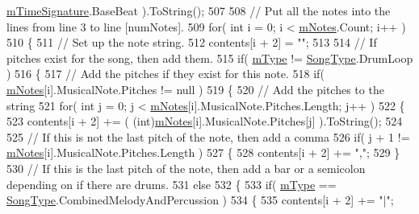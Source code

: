 \begin{DoxyCode}
      \hyperlink{group___song_priv_var_ga2b2dcc0e83e49f7303b6a1371877b25e}{mTimeSignature}.BaseBeat ).ToString();
507 
508         \textcolor{comment}{// Put all the notes into the lines from line 3 to line [numNotes].  }
509         \textcolor{keywordflow}{for}( \textcolor{keywordtype}{int} i = 0; i < \hyperlink{group___song_priv_var_ga674bc904a1f856d485d5fb7fe84bac85}{mNotes}.Count; i++ )
510         \{
511             \textcolor{comment}{// Set up the note string.}
512             contents[i + 2] = \textcolor{stringliteral}{""};
513 
514             \textcolor{comment}{// If pitches exist for the song, then add them.}
515             \textcolor{keywordflow}{if}( \hyperlink{group___song_priv_var_gaf3b9d0f461522324f897b746311b43c5}{mType} != \hyperlink{group___song_enums_gae681a1f001333e39fc1cb4fea97bfe1b}{SongType}.DrumLoop )
516             \{
517                 \textcolor{comment}{// Add the pitches if they exist for this note.}
518                 \textcolor{keywordflow}{if}( \hyperlink{group___song_priv_var_ga674bc904a1f856d485d5fb7fe84bac85}{mNotes}[i].MusicalNote.Pitches != null )
519                 \{
520                     \textcolor{comment}{// Add the pitches to the string}
521                     \textcolor{keywordflow}{for}( \textcolor{keywordtype}{int} j = 0; j < \hyperlink{group___song_priv_var_ga674bc904a1f856d485d5fb7fe84bac85}{mNotes}[i].MusicalNote.Pitches.Length; j++ )
522                     \{
523                         contents[i + 2] += ( (int)\hyperlink{group___song_priv_var_ga674bc904a1f856d485d5fb7fe84bac85}{mNotes}[i].MusicalNote.Pitches[j] ).ToString();
524 
525                         \textcolor{comment}{// If this is not the last pitch of the note, then add a comma}
526                         \textcolor{keywordflow}{if}( j + 1 != \hyperlink{group___song_priv_var_ga674bc904a1f856d485d5fb7fe84bac85}{mNotes}[i].MusicalNote.Pitches.Length )
527                         \{
528                             contents[i + 2] += \textcolor{stringliteral}{","};
529                         \}
530                         \textcolor{comment}{// If this is the last pitch of the note, then add a bar or a semicolon depending
       on if there are drums.}
531                         \textcolor{keywordflow}{else}
532                         \{
533                             \textcolor{keywordflow}{if}( \hyperlink{group___song_priv_var_gaf3b9d0f461522324f897b746311b43c5}{mType} == \hyperlink{group___song_enums_gae681a1f001333e39fc1cb4fea97bfe1b}{SongType}.CombinedMelodyAndPercussion )
534                             \{
535                                 contents[i + 2] += \textcolor{stringliteral}{"|"};

\end{DoxyCode}
